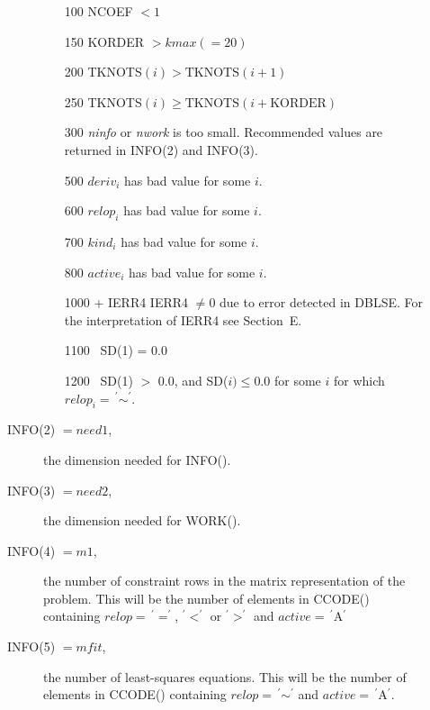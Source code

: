\documentclass[twoside]{MATH77}
\begin{document}
\begin{description}
\begin{description}
\begin{itemize}
\item[100]  NCOEF $<1$

\item[150]  KORDER $>kmax(=20)$

\item[200]  TKNOTS$(i)>\text{TKNOTS}(i+1)$

\item[250]  TKNOTS$(i)\geq \text{TKNOTS}(i+\text{KORDER})$

\item[300]  {\em ninfo} or {\em nwork} is too small. Recommended values
are returned in INFO(2) and INFO(3).

\item[500]  $deriv_i$ has bad value for some $i.$

\item[600]  $relop_i$ has bad value for some $i.$

\item[700]  $kind_i$ has bad value for some $i.$

\item[800]  $active_i$ has bad value for some $i.$

\item[1000]  + IERR4 \quad IERR4 $\neq 0$ due to error detected in DBLSE.
For the interpretation of IERR4 see Section~E.

\item[\rm 1100] \  SD(1) = 0.0

\item[\rm 1200] \  SD(1) $>$ 0.0, and SD($i) \leq 0.0$ for some $i$
for which $relop_i =\,^{\prime}{\sim }^{\prime}$.

\end{itemize}
\item[\rm INFO(2) $= need1$,]  the dimension needed for INFO().

\item[\rm INFO(3) $= need2$,]  the dimension needed for WORK().

\item[\rm INFO(4) $= m1$,]  the number of constraint rows in the matrix
representation of the problem. This will be the number of elements in
CCODE() containing $relop=\,^{\prime }{=}^{\prime }$, $^{\prime }{<}^{\prime }$
or $^{\prime }{>}^{\prime }$ and $active =\,^{\prime }$A$^{\prime }$

\item[\rm INFO(5) $= mfit$,]  the number of least-squares equations. This
will be the number of elements in CCODE() containing $relop=\,^{\prime
}{\sim }^{\prime }$ and $active=\,^{\prime }$A$^{\prime }.$


\end{description}
\end{description}
\end{document}
